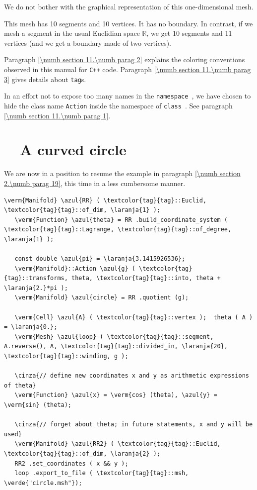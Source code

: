 We do not bother with the graphical representation of this one-dimensional mesh.

This mesh has 10 segments and 10 vertices. It has no boundary.
In contrast, if we mesh a segment in the usual Euclidian space $ \mathbb{R} $,
we get 10 segments and 11 vertices (and we get a boundary made of two vertices).

Paragraph \ref{\numb section 11.\numb parag 2} explains the coloring conventions observed
in this manual for {\tt C++} code.
Paragraph \ref{\numb section 11.\numb parag 3} gives details about
{\small\tt\textcolor{tag}{tag}}s.

In an effort not to expose too many names in the {\small\tt namespace },
we have chosen to hide the class name {\small\tt Action} inside the namespace of
{\small\tt class }.
See paragraph \ref{\numb section 11.\numb parag 1}.


\section{~~A curved circle}\label{\numb section 7.\numb parag 2}

We are now in a position to resume the example in paragraph \ref{\numb section 2.\numb parag 19},
this time in a less cumbersome manner.

\begin{Verbatim}[commandchars=\\\{\},formatcom=\small\tt,frame=single,
   label=parag-\ref{\numb section 7.\numb parag 2}.cpp,rulecolor=\color{moldura},
   baselinestretch=0.94,framesep=2mm                                            ]
   \verm{Manifold} \azul{RR} ( \textcolor{tag}{tag}::Euclid, \textcolor{tag}{tag}::of_dim, \laranja{1} );
   \verm{Function} \azul{theta} = RR .build_coordinate_system ( \textcolor{tag}{tag}::Lagrange, \textcolor{tag}{tag}::of_degree, \laranja{1} );

   const double \azul{pi} = \laranja{3.1415926536};
   \verm{Manifold}::Action \azul{g} ( \textcolor{tag}{tag}::transforms, theta, \textcolor{tag}{tag}::into, theta + \laranja{2.}*pi );
   \verm{Manifold} \azul{circle} = RR .quotient (g);

   \verm{Cell} \azul{A} ( \textcolor{tag}{tag}::vertex );  theta ( A ) = \laranja{0.};
   \verm{Mesh} \azul{loop} ( \textcolor{tag}{tag}::segment, A.reverse(), A, \textcolor{tag}{tag}::divided_in, \laranja{20}, \textcolor{tag}{tag}::winding, g );

   \cinza{// define new coordinates x and y as arithmetic expressions of theta}
   \verm{Function} \azul{x} = \verm{cos} (theta), \azul{y} = \verm{sin} (theta);

   \cinza{// forget about theta; in future statements, x and y will be used}
   \verm{Manifold} \azul{RR2} ( \textcolor{tag}{tag}::Euclid, \textcolor{tag}{tag}::of_dim, \laranja{2} );
   RR2 .set_coordinates ( x && y );
   loop .export_to_file ( \textcolor{tag}{tag}::msh, \verde{"circle.msh"});
\end{Verbatim}

